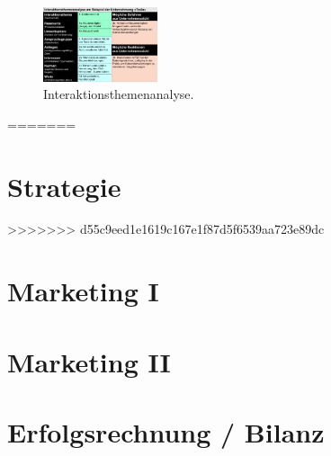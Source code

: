 \documentclass{article}
\begin{document}
\begin{figure}[H]
\centering
\includegraphics[width=0.3\textwidth]{Resources/Image/Interaktionsthemenanalyse.png}
\caption{\label{fig:Interaktionsthemenanalyse}Interaktionsthemenanalyse.}
\end{figure}
=======
\section{Strategie}

>>>>>>> d55c9eed1e1619c167e1f87d5f6539aa723e89dc

\pagebreak
\section{Marketing I}



\section{Marketing II}




\section{Erfolgsrechnung / Bilanz}

\end{document}

